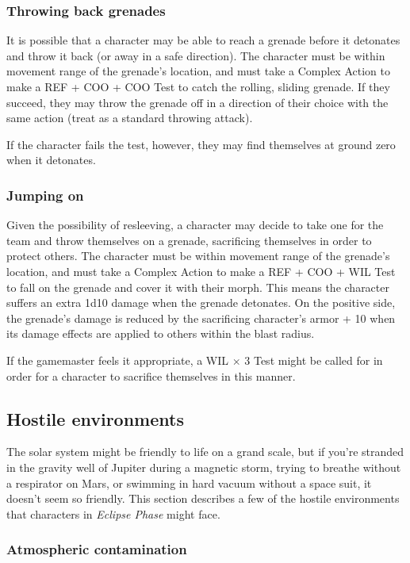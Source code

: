 \subsubsection{Throwing back grenades}

It is possible that a character may be able to reach a grenade before it detonates and throw it back (or away in a safe direction). The character must be within movement range of the grenade’s location, and must take a Complex Action to make a REF + COO + COO Test to catch the rolling, sliding grenade. If they succeed, they may throw the grenade off in a direction of their choice with the same action (treat as a standard throwing attack).

If the character fails the test, however, they may find themselves at ground zero when it detonates.

\subsubsection{Jumping on}

Given the possibility of resleeving, a character may decide to take one for the team and throw themselves on a grenade, sacrificing themselves in order to protect others. The character must be within movement range of the grenade’s location, and must take a Complex Action to make a REF + COO + WIL Test to fall on the grenade and cover it with their morph. This means the character suffers an extra 1d10 damage when the grenade detonates. On the positive side, the grenade’s damage is reduced by the sacrificing character’s armor + 10 when its damage effects are applied to others within the blast radius.

If the gamemaster feels it appropriate, a WIL $\times$ 3 Test might be called for in order for a character to sacrifice themselves in this manner.

\subsection{Hostile environments}
\label{sec:hostile-environments} The solar system might be friendly to life on a grand scale, but if you’re stranded in the gravity well of Jupiter during a magnetic storm, trying to breathe without a respirator on Mars, or swimming in hard vacuum without a space suit, it doesn’t seem so friendly. This section describes a few of the hostile environments that characters in \emph{Eclipse Phase} might face.

\subsubsection{Atmospheric contamination}


